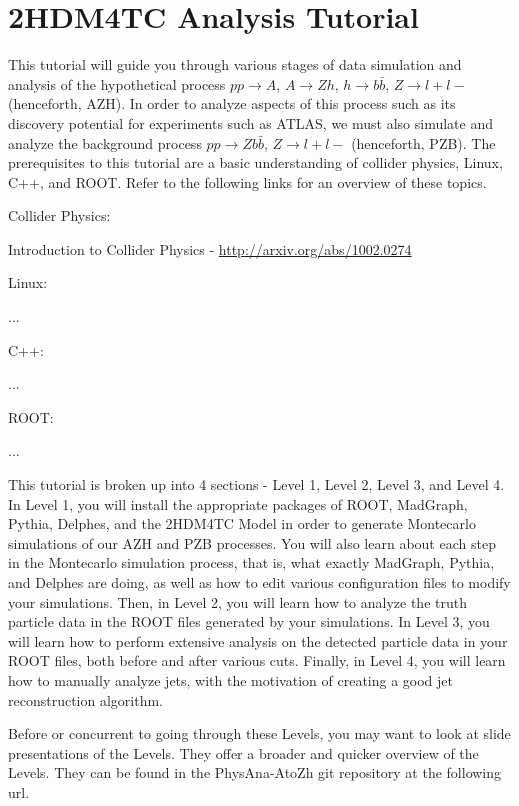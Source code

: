 \documentclass{article}
\begin{document}
\section*{2HDM4TC Analysis Tutorial}

This tutorial will guide you through various stages of data simulation and analysis of the hypothetical process 
$p p \rightarrow{} A$, $A \rightarrow{} Z h$, $h \rightarrow{} b \bar{b}$, $Z \rightarrow{} l+ l-$ (henceforth, AZH).
In order to analyze aspects of this process such as its discovery potential for experiments such as ATLAS, we must also simulate and analyze the background process
$p p \rightarrow{} Z b \bar{b}$, $Z \rightarrow{} l+ l-$ (henceforth, PZB).
The prerequisites to this tutorial are a basic understanding of collider physics, Linux, C++, and ROOT. Refer to the following links for an overview of these topics.

\bigskip

Collider Physics:

Introduction to Collider Physics - \url{http://arxiv.org/abs/1002.0274}

\bigskip

Linux:

...

\bigskip

C++:

...

\bigskip

ROOT:

...

\bigskip

This tutorial is broken up into 4 sections - Level 1, Level 2, Level 3, and Level 4.
In Level 1, you will install the appropriate packages of ROOT, MadGraph,
Pythia, Delphes, and the 2HDM4TC Model in order to generate Montecarlo simulations of
our AZH and PZB processes. You will also learn about each step in the Montecarlo simulation process,
that is, what exactly MadGraph, Pythia, and Delphes are doing, as well as how to edit
various configuration files to modify your simulations. Then, in Level 2, you will learn
how to analyze the truth particle data in the ROOT files generated by your simulations.
In Level 3, you will learn how to perform extensive analysis on the detected particle
data in your ROOT files, both before and after various cuts. Finally, in Level 4, you will
learn how to manually analyze jets, with the motivation of creating a good jet reconstruction algorithm.

\bigskip

Before or concurrent to going through these Levels, you may want to look at slide presentations
of the Levels. They offer a broader and quicker overview of the Levels. They can be found in the
PhysAna-AtoZh git repository at the following url.
\end{document}
